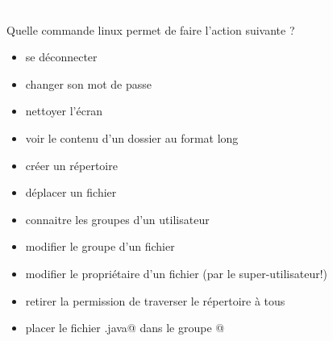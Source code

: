 \documentclass[11pt,a4paper]{article}
\begin{document}
                \textcolor{white}{.} \par
            Quelle commande linux permet de faire l'action suivante ?
					\begin{itemize}
				
			\item se d\'econnecter  \textcolor{gray}{\underline{\hspace*{3em}}} 
			\item changer son mot de passe  \textcolor{gray}{\underline{\hspace*{5em}}} 
			\item nettoyer l'\'ecran  \textcolor{gray}{\underline{\hspace*{3em}}} 
			\item voir le contenu d'un dossier au format long
									 \textcolor{gray}{\underline{\hspace*{2em}}}  \textcolor{gray}{\underline{\hspace*{2em}}} 
			\item cr\'eer un r\'epertoire  \textcolor{gray}{\underline{\hspace*{3em}}} 
			\item d\'eplacer un fichier  \textcolor{gray}{\underline{\hspace*{2em}}} 
			\item connaitre les groupes d'un utilisateur  \textcolor{gray}{\underline{\hspace*{5em}}} 
			\item modifier le groupe d'un fichier  \textcolor{gray}{\underline{\hspace*{3em}}} 
			\item modifier le propri\'etaire d'un fichier (par le super-utilisateur!)         
									 \textcolor{gray}{\underline{\hspace*{3em}}} 
			\item 
								  retirer la permission de traverser le r\'epertoire 
									\verb@tds@ \`a tous       
									 \textcolor{gray}{\underline{\hspace*{3em}}}  \textcolor{gray}{\underline{\hspace*{2em}}}  \textcolor{gray}{\underline{\hspace*{2em}}} 
			\item 
								  placer le fichier \verb@Hello.java@ 
									dans le groupe @ \textcolor{gray}{\underline{\hspace*{3em}}}  \textcolor{gray}{\underline{\hspace*{10em}}}  \textcolor{gray}{\underline{\hspace*{10em}}} 
					\end{itemize}
				
\end{document}
